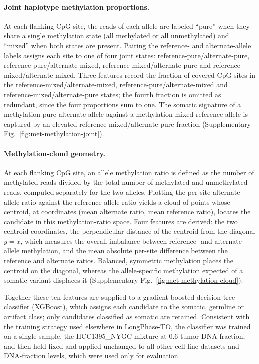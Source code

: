 \documentclass[pdflatex,sn-nature]{sn-jnl}
\begin{document}
\paragraph{Joint haplotype methylation proportions.} At each flanking CpG site, the reads of each allele are labeled ``pure'' when they share a single methylation state (all methylated or all unmethylated) and ``mixed'' when both states are present. Pairing the reference- and alternate-allele labels assigns each site to one of four joint states: reference-pure/alternate-pure, reference-pure/alternate-mixed, reference-mixed/alternate-pure and reference-mixed/alternate-mixed. Three features record the fraction of covered CpG sites in the reference-mixed/alternate-mixed, reference-pure/alternate-mixed and reference-mixed/alternate-pure states; the fourth fraction is omitted as redundant, since the four proportions sum to one. The somatic signature of a methylation-pure alternate allele against a methylation-mixed reference allele is captured by an elevated reference-mixed/alternate-pure fraction (Supplementary Fig.~\ref{fig:met-methylation-joint}).

\paragraph{Methylation-cloud geometry.} At each flanking CpG site, an allele methylation ratio is defined as the number of methylated reads divided by the total number of methylated and unmethylated reads, computed separately for the two alleles. Plotting the per-site alternate-allele ratio against the reference-allele ratio yields a cloud of points whose centroid, at coordinates (mean alternate ratio, mean reference ratio), locates the candidate in this methylation-ratio space. Four features are derived: the two centroid coordinates, the perpendicular distance of the centroid from the diagonal \(y=x\), which measures the overall imbalance between reference- and alternate-allele methylation, and the mean absolute per-site difference between the reference and alternate ratios. Balanced, symmetric methylation places the centroid on the diagonal, whereas the allele-specific methylation expected of a somatic variant displaces it (Supplementary Fig.~\ref{fig:met-methylation-cloud}).

Together these ten features are supplied to a gradient-boosted decision-tree classifier (XGBoost), which assigns each candidate to the somatic, germline or artifact class; only candidates classified as somatic are retained. Consistent with the training strategy used elsewhere in LongPhase-TO, the classifier was trained on a single sample, the HCC1395\_NYGC mixture at 0.6 tumor DNA fraction, and then held fixed and applied unchanged to all other cell-line datasets and DNA-fraction levels, which were used only for evaluation.
\end{document}
